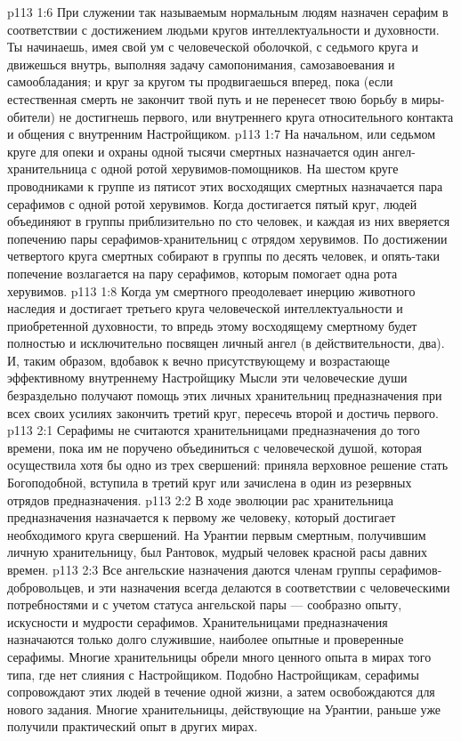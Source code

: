 \vs p113 1:6 \pc При служении так называемым нормальным людям назначен серафим в соответствии с достижением людьми кругов интеллектуальности и духовности. Ты начинаешь, имея свой ум с человеческой оболочкой, с седьмого круга и движешься внутрь, выполняя задачу самопонимания, самозавоевания и самообладания; и круг за кругом ты продвигаешься вперед, пока (если естественная смерть не закончит твой путь и не перенесет твою борьбу в миры\hyp{}обители) не достигнешь первого, или внутреннего круга относительного контакта и общения с внутренним Настройщиком.
\vs p113 1:7 На начальном, или седьмом круге для опеки и охраны одной тысячи смертных назначается один ангел\hyp{}хранительница с одной ротой херувимов\hyp{}помощников. На шестом круге проводниками к группе из пятисот этих восходящих смертных назначается пара серафимов с одной ротой херувимов. Когда достигается пятый круг, людей объединяют в группы приблизительно по сто человек, и каждая из них вверяется попечению пары серафимов\hyp{}хранительниц с отрядом херувимов. По достижении четвертого круга смертных собирают в группы по десять человек, и опять\hyp{}таки попечение возлагается на пару серафимов, которым помогает одна рота херувимов.
\vs p113 1:8 Когда ум смертного преодолевает инерцию животного наследия и достигает третьего круга человеческой интеллектуальности и приобретенной духовности, то впредь этому восходящему смертному будет полностью и исключительно посвящен личный ангел (в действительности, два). И, таким образом, вдобавок к вечно присутствующему и возрастающе эффективному внутреннему Настройщику Мысли эти человеческие души безраздельно получают помощь этих личных хранительниц предназначения при всех своих усилиях закончить третий круг, пересечь второй и достичь первого.
\vs p113 2:1 Серафимы не считаются хранительницами предназначения до того времени, пока им не поручено объединиться с человеческой душой, которая осуществила хотя бы одно из трех свершений: приняла верховное решение стать Богоподобной, вступила в третий круг или зачислена в один из резервных отрядов предназначения.
\vs p113 2:2 В ходе эволюции рас хранительница предназначения назначается к первому же человеку, который достигает необходимого круга свершений. На Урантии первым смертным, получившим личную хранительницу, был Рантовок, мудрый человек красной расы давних времен.
\vs p113 2:3 Все ангельские назначения даются членам группы серафимов\hyp{}добровольцев, и эти назначения всегда делаются в соответствии с человеческими потребностями и с учетом статуса ангельской пары --- сообразно опыту, искусности и мудрости серафимов. Хранительницами предназначения назначаются только долго служившие, наиболее опытные и проверенные серафимы. Многие хранительницы обрели много ценного опыта в мирах того типа, где нет слияния с Настройщиком. Подобно Настройщикам, серафимы сопровождают этих людей в течение одной жизни, а затем освобождаются для нового задания. Многие хранительницы, действующие на Урантии, раньше уже получили практический опыт в других мирах.
